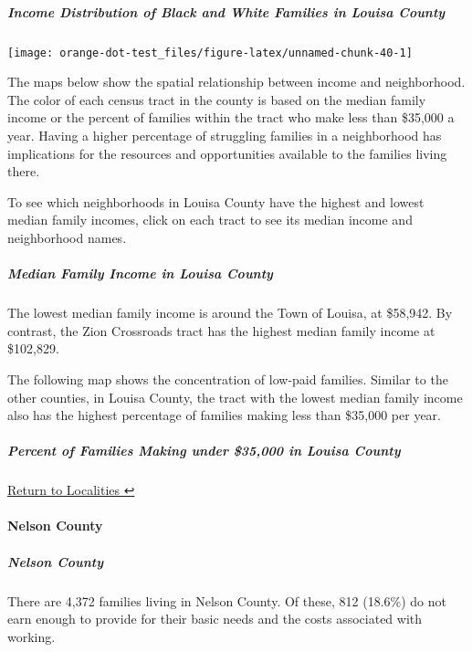 \documentclass[
]{article}
\begin{document}
\hypertarget{income-distribution-of-black-and-white-families-in-louisa-county}{%
\subparagraph{Income Distribution of Black and White Families in Louisa
County}\label{income-distribution-of-black-and-white-families-in-louisa-county}}

\begin{center}\texttt{[image: orange-dot-test\_files/figure-latex/unnamed-chunk-40-1]} \end{center}

The maps below show the spatial relationship between income and
neighborhood. The color of each census tract in the county is based on
the median family income or the percent of families within the tract who
make less than \$35,000 a year. Having a higher percentage of struggling
families in a neighborhood has implications for the resources and
opportunities available to the families living there.

To see which neighborhoods in Louisa County have the highest and lowest
median family incomes, click on each tract to see its median income and
neighborhood names.

\hypertarget{median-family-income-in-louisa-county}{%
\subparagraph{Median Family Income in Louisa
County}\label{median-family-income-in-louisa-county}}

The lowest median family income is around the Town of Louisa, at
\$58,942. By contrast, the Zion Crossroads tract has the highest median
family income at \$102,829.

The following map shows the concentration of low-paid families. Similar
to the other counties, in Louisa County, the tract with the lowest
median family income also has the highest percentage of families making
less than \$35,000 per year.

\hypertarget{percent-of-families-making-under-35000-in-louisa-county}{%
\subparagraph{Percent of Families Making under \$35,000 in Louisa
County}\label{percent-of-families-making-under-35000-in-louisa-county}}

\protect\hyperlink{localities}{Return to Localities ↩︎}

\hypertarget{nelson-county}{%
\paragraph{Nelson County}\label{nelson-county}}

\hypertarget{nelson-county-1}{%
\subparagraph{Nelson County}\label{nelson-county-1}}

There are 4,372 families living in Nelson County. Of these, 812 (18.6\%)
do not earn enough to provide for their basic needs and the costs
associated with working.
\end{document}
